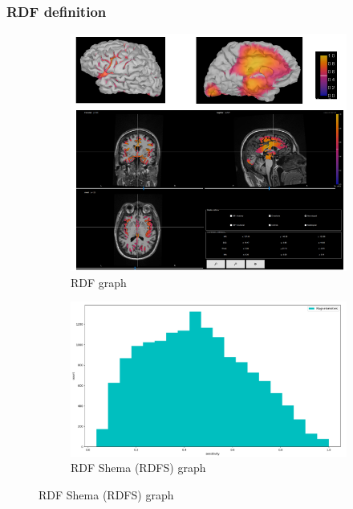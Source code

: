 \documentclass{beamer}
\numberwithin{figure}{section}
\numberwithin{equation}{section}
\begin{document}
\section{}
\begin{frame}
 \frametitle{RDF definition}
  

 	\begin{figure}[h]
        \begin{subfigure}[h]{0.53\linewidth} 
            \includegraphics[width=\linewidth]{pictures/meg1}
            \caption{\tiny RDF graph}
            \label{fig:rdf_graph}
        \end{subfigure}       
        \begin{subfigure}[h]{0.45\linewidth} 
            \includegraphics[width=\linewidth]{pictures/HISTmeg2.png}
            \caption{\tiny RDF Shema (RDFS) graph}
            \label{fig:rdfs_graph}
        \end{subfigure}
    \end{figure}

  
\end{frame}
\end{document}
